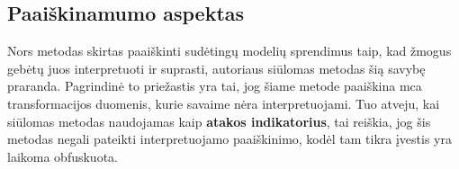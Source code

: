 \subsection{Paaiškinamumo aspektas}

Nors \LIME metodas skirtas paaiškinti sudėtingų modelių sprendimus taip, kad žmogus gebėtų juos interpretuoti ir suprasti, autoriaus siūlomas metodas šią savybę praranda. Pagrindinė to priežastis yra tai, jog šiame metode \LIME paaiškina \gls{mca} transformacijos duomenis, kurie savaime nėra interpretuojami. Tuo atveju, kai siūlomas metodas naudojamas kaip \textbf{atakos indikatorius}, tai reiškia, jog šis metodas negali pateikti interpretuojamo paaiškinimo, kodėl tam tikra įvestis yra laikoma obfuskuota.  


